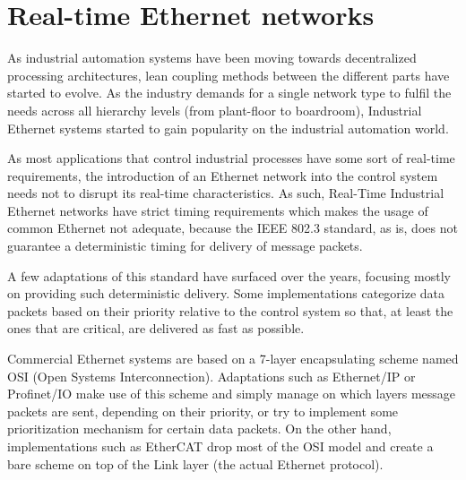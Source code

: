 \section{Real-time Ethernet networks}\label{sec:rt-networks}

As industrial automation systems have been moving towards decentralized processing architectures, lean coupling methods between the different parts have started to evolve.
As the industry demands for a single network type to fulfil the needs across all hierarchy levels (from plant-floor to boardroom), Industrial Ethernet systems started to gain popularity on the industrial automation world.

As most applications that control industrial processes have some sort of real-time requirements, the introduction of an Ethernet network into the control system needs not to disrupt its real-time characteristics.
As such, Real-Time Industrial Ethernet networks have strict timing requirements which makes the usage of common Ethernet not adequate, because the IEEE 802.3 standard, as is, does not guarantee a deterministic timing for delivery of message packets.

A few adaptations of this standard have surfaced over the years, focusing mostly on providing such deterministic delivery.
Some implementations categorize data packets based on their priority relative to the control system so that, at least the ones that are critical, are delivered as fast as possible.

Commercial Ethernet systems are based on a 7-layer encapsulating scheme named OSI (Open Systems Interconnection).
Adaptations such as Ethernet/IP or Profinet/IO make use of this scheme and simply manage on which layers message packets are sent, depending on their priority, or try to implement some prioritization mechanism for certain data packets.
On the other hand, implementations such as EtherCAT drop most of the OSI model and create a bare scheme on top of the Link layer (the actual Ethernet protocol).

